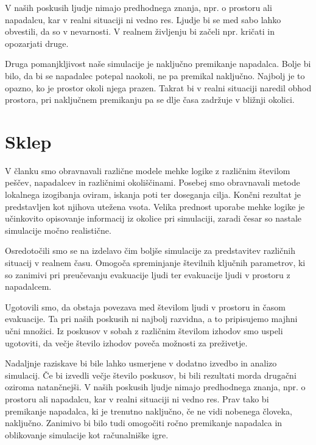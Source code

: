 \documentclass[9pt]{pnas-new}
\begin{document}
V naših poskusih ljudje nimajo predhodnega znanja, npr. o prostoru ali napadalcu, kar v realni situaciji ni vedno res. Ljudje bi se med sabo lahko obvestili, da so v nevarnosti. V realnem življenju bi začeli npr. kričati in opozarjati druge.

Druga pomanjkljivost naše simulacije je naključno premikanje napadalca. Bolje bi bilo, da bi se napadalec potepal naokoli, ne pa premikal naključno. Najbolj je to opazno, ko je prostor okoli njega prazen. Takrat bi v realni situaciji naredil obhod prostora, pri naključnem premikanju pa se dlje časa zadržuje v bližnji okolici.


\section*{Sklep}
V članku smo obravnavali različne modele mehke logike z različnim številom peščev, napadalcev in različnimi okoliščinami. 
Posebej smo obravnavali metode lokalnega izogibanja oviram, iskanja poti ter doseganja cilja. Končni rezultat je predstavljen kot njihova utežena vsota. 
Velika prednost uporabe mehke logike je učinkovito opisovanje informacij iz okolice pri simulaciji, zaradi česar so nastale simulacije močno realistične.

Osredotočili smo se na izdelavo čim boljše simulacije za predstavitev različnih situacij v realnem času. Omogoča spreminjanje številnih ključnih parametrov, ki so zanimivi pri preučevanju evakuacije ljudi ter evakuacije ljudi v prostoru z napadalcem. 

Ugotovili smo, da obstaja povezava med številom ljudi v prostoru in časom evakuacije. Ta pri naših poskusih ni najbolj razvidna, a to pripisujemo majhni učni množici. Iz poskusov v sobah z različnim številom izhodov smo uspeli ugotoviti, da večje število izhodov poveča možnosti za preživetje.

Nadaljnje raziskave bi bile lahko usmerjene v dodatno izvedbo in analizo simulacij. Če bi izvedli večje število poskusov, bi bili rezultati morda drugačni oziroma natančnejši. V naših poskusih ljudje nimajo predhodnega znanja, npr. o prostoru ali napadalcu, kar v realni situaciji ni vedno res. Prav tako bi premikanje napadalca, ki je trenutno naključno, če ne vidi nobenega človeka, naključno. Zanimivo bi bilo tudi omogočiti ročno premikanje napadalca in oblikovanje simulacije kot računalniške igre.


\showacknow %


\begin{multicols}{2}
\section*{\bibname}

\end{multicols}
\end{document}
